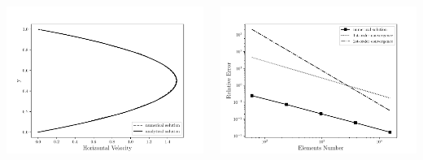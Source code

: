 \begin{frame}
\begin{center}
\begin{columns}[c]
\begin{column}{0.55\textwidth} 
  \includegraphics[scale=0.4]{images/poiseuille_velocity.pdf}
\end{column}

\begin{column}{0.55\textwidth} 
\hspace{0.5cm}
  \includegraphics[scale=0.4]{images/poiseuille_error.pdf}
\end{column}

\end{columns}
\end{center}
\end{frame}

